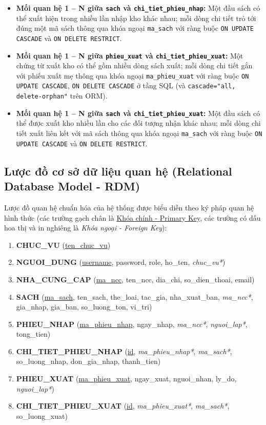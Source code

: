 \documentclass[12pt,a4paper]{article}
\begin{document}
\begin{itemize}
    \item \textbf{Mối quan hệ 1 -- N giữa \texttt{sach} và \texttt{chi\_tiet\_phieu\_nhap}:} Một đầu sách có thể xuất hiện trong nhiều lần nhập kho khác nhau; mỗi dòng chi tiết trỏ tới đúng một mã sách thông qua khóa ngoại \texttt{ma\_sach} với ràng buộc \texttt{ON UPDATE CASCADE} và \texttt{ON DELETE RESTRICT}.
    \item \textbf{Mối quan hệ 1 -- N giữa \texttt{phieu\_xuat} và \texttt{chi\_tiet\_phieu\_xuat}:} Một chứng từ xuất kho có thể gồm nhiều dòng sách xuất; mỗi dòng chi tiết gắn với phiếu xuất mẹ thông qua khóa ngoại \texttt{ma\_phieu\_xuat} với ràng buộc \texttt{ON UPDATE CASCADE}, \texttt{ON DELETE CASCADE} ở tầng SQL (và \texttt{cascade="all, delete-orphan"} trên ORM).
    \item \textbf{Mối quan hệ 1 -- N giữa \texttt{sach} và \texttt{chi\_tiet\_phieu\_xuat}:} Một đầu sách có thể được xuất kho nhiều lần cho các đối tượng nhận khác nhau; mỗi dòng chi tiết xuất liên kết với mã sách thông qua khóa ngoại \texttt{ma\_sach} với ràng buộc \texttt{ON UPDATE CASCADE} và \texttt{ON DELETE RESTRICT}.
\end{itemize}

\subsection{Lược đồ cơ sở dữ liệu quan hệ (Relational Database Model - RDM)}
\label{subsec:rdm}

Lược đồ quan hệ chuẩn hóa của hệ thống được biểu diễn theo ký pháp quan hệ hình thức (các trường gạch chân là \underline{Khóa chính - Primary Key}, các trường có dấu hoa thị và in nghiêng là \textit{Khóa ngoại - Foreign Key}):
\begin{enumerate}[label=\textbf{\arabic*.}]
    \item \textbf{CHUC\_VU} (\underline{ten\_chuc\_vu})
    \item \textbf{NGUOI\_DUNG} (\underline{username}, password, role, ho\_ten, \textit{chuc\_vu*})
    \item \textbf{NHA\_CUNG\_CAP} (\underline{ma\_ncc}, ten\_ncc, dia\_chi, so\_dien\_thoai, email)
    \item \textbf{SACH} (\underline{ma\_sach}, ten\_sach, the\_loai, tac\_gia, nha\_xuat\_ban, \textit{ma\_ncc*}, gia\_nhap, gia\_ban, so\_luong\_ton, vi\_tri)
    \item \textbf{PHIEU\_NHAP} (\underline{ma\_phieu\_nhap}, ngay\_nhap, \textit{ma\_ncc*}, \textit{nguoi\_lap*}, tong\_tien)
    \item \textbf{CHI\_TIET\_PHIEU\_NHAP} (\underline{id}, \textit{ma\_phieu\_nhap*}, \textit{ma\_sach*}, so\_luong\_nhap, don\_gia\_nhap, thanh\_tien)
    \item \textbf{PHIEU\_XUAT} (\underline{ma\_phieu\_xuat}, ngay\_xuat, nguoi\_nhan, ly\_do, \textit{nguoi\_lap*})
    \item \textbf{CHI\_TIET\_PHIEU\_XUAT} (\underline{id}, \textit{ma\_phieu\_xuat*}, \textit{ma\_sach*}, so\_luong\_xuat)
\end{enumerate}
\end{document}
